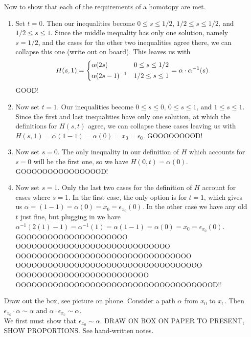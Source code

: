 \documentclass{article}
\newcommand{\inv}[1]{#1^{-1}}
\newcommand{\inv}[1]{#1^{-1}}
\begin{document}
Now to show that each of the requirements of a homotopy are met. 
\begin{enumerate}
    \item Set $t = 0$. Then our inequalities become $0 \le s \le 1/2$, $1/2\le s \le 1/2$, and $1/2 \le s \le 1$. Since the middle inequality has only one solution, namely $s = 1/2$, and the cases for the other two inequalities agree there, we can collapse this one (write out on board). This leaves us with 
    $$H(s,1) = \begin{dcases}
    \alpha(2s) & 0\le s\le 1/2\\
    \inv{\alpha(2s - 1)} & 1/2\le s \le 1
    \end{dcases} = \alpha\cdot\inv{\alpha}(s).$$ GOOD!
    \item Now set $t = 1$. Our inequalities become $0 \le s \le 0$, $0\le s \le 1$, and $1\le s \le 1$. Since the first and last inequalities have only one solution, at which the definitions for $H(s,t)$ agree, we can collapse these cases leaving us with $H(s,1) = \alpha(1-1) = \alpha(0) = x_0 = \epsilon_0$. GOOOOOOOOD!
    \item Now set $ s = 0$. The only inequality in our definition of $H$ which accounts for $s = 0$ will be the first one, so we have $H(0,t) = \alpha(0)$. GOOOOOOOOOOOOOOOD!
    \item Now set $s= 1$. Only the last two cases for the definition of $H$ account for cases where $s = 1$. In the first case, the only option is for $t = 1$, which gives us $\alpha = (1-1) = \alpha(0) = x_0 = \epsilon_{x_0}(0)$. In the other case we have any old $t$ just fine, but plugging in we have $\inv{\alpha}(2(1) - 1)= \inv{\alpha}(1) = \alpha(1-1) = \alpha(0) = x_0 = \epsilon_{x_0}(0)$. GOOOOOOOOOOOOOOOOOOOO\\OOOOOOOOOOOOOOOOOOOOOOOOOOOOO\\OOOOOOOOOOOOOOOOOOOOOOOOOOOOOOOOO\\OOOOOOOOOOOOOOOOOOOOOOOOOOOOOOOOOOO\\OOOOOOOOOOOOOOOOOOOOOOOOO\\OOOOOOOOOOOOOOOOOOOOOOOOOOOOOOOOOOOOOD!!
\end{enumerate}

 Draw out the box, see picture on phone. Consider a path $\alpha$ from $x_0$ to $x_1$. Then $\epsilon_{x_0}\cdot \alpha \sim \alpha$ and $\alpha \cdot \epsilon_{x_0} \sim \alpha$. \\

We first must show that $\epsilon_{x_0} \sim \alpha$. DRAW ON BOX ON PAPER TO PRESENT, SHOW PROPORTIONS. See hand-written notes.
\end{document}
